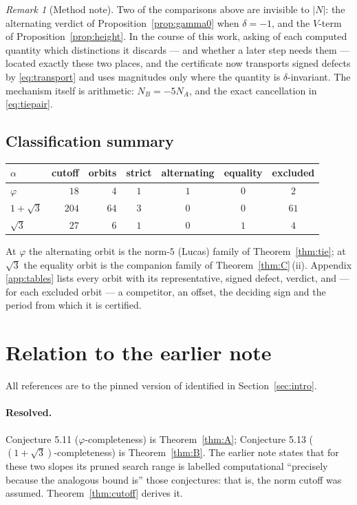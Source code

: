 \documentclass[11pt]{article}
\theoremstyle{definition}
\theoremstyle{remark}
\newtheorem{remark}[theorem]{Remark}
\begin{document}
\begin{remark}[Method note]\label{rem:signmethod}
Two of the comparisons above are invisible to $|N|$: the alternating verdict of
Proposition~\ref{prop:gamma0} when $\delta=-1$, and the $V$-term of
Proposition~\ref{prop:height}. In the course of this work, asking of each computed quantity
which distinctions it discards --- and whether a later step needs them --- located exactly these
two places, and the certificate now transports signed defects by \eqref{eq:transport} and uses
magnitudes only where the quantity is $\delta$-invariant. The mechanism itself is arithmetic:
$N_B=-5N_A$, and the exact cancellation in \eqref{eq:tiepair}.
\end{remark}

\subsection{Classification summary}\label{sec:summary}

\begin{center}
\begin{tabular}{lrrcccc}
\toprule
$\alpha$ & cutoff & orbits & strict & alternating & equality & excluded \\
\midrule
$\varphi$     & $18$  & $4$  & $1$ & $1$ & $0$ & $2$ \\
$1+\sqrt3$    & $204$ & $64$ & $3$ & $0$ & $0$ & $61$ \\
$\sqrt3$      & $27$  & $6$  & $1$ & $0$ & $1$ & $4$ \\
\bottomrule
\end{tabular}
\end{center}

At $\varphi$ the alternating orbit is the norm-$5$ (Lucas) family of Theorem~\ref{thm:tie}; at
$\sqrt3$ the equality orbit is the companion family of Theorem~\ref{thm:C}\,(ii). Appendix
\ref{app:tables} lists every orbit with its representative, signed defect, verdict, and --- for
each excluded orbit --- a competitor, an offset, the deciding sign and the period from which it
is certified.

\section{Relation to the earlier note}\label{sec:earlier}

All references are to the pinned version of \cite{DeJesus2026} identified in
Section~\ref{sec:intro}.

\paragraph{Resolved.}
Conjecture 5.11 ($\varphi$-completeness) is Theorem~\ref{thm:A}; Conjecture 5.13
($(1+\sqrt3)$-completeness) is Theorem~\ref{thm:B}. The earlier note states that for these two
slopes its pruned search range is labelled computational ``precisely because the analogous bound
is'' those conjectures: that is, the norm cutoff was assumed. Theorem~\ref{thm:cutoff} derives
it.
\end{document}
